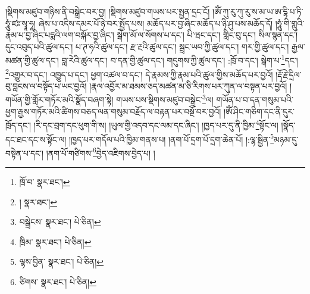 །སྡིགས་མཛུབ་གཉིས་ནི་བསྒྲེང་བར་བྱ། །སྡིགས་མཛུབ་གཡས་པར་སྤྱན་དྲང་ངོ། །ཨོཾ་ཀུ་རུ་ཀུ་རུ་ས་མ་ཡ་ཨ་དྷི་པ་ཏི་ཧཱུཾ་ཛཿ་སྭཱ་ཧཱ། ཞེས་པ་འདིས་དམར་པོ་ཉེ་བར་སྤྱོད་པས། མཆོད་པར་བྱ་ཞིང་མཆོད་པ་ཉི་ཤུ་པས་མཆོད་དོ། །ཧཱུཾ་གི་གླུའི་རྣམ་པ་བྱ་ཞིང་པདྨའི་ལག་བསྐོར་བྱ་ཞིང་། སྒེག་མོ་ལ་སོགས་པ་དང་། པི་ཝང་དང་། གླིང་བུ་དང་། སིལ་སྙན་དང་། དུང་འབུད་པའི་ཚུལ་དང་། པ་ཊ་ཧའི་ཚུལ་དང་། རྫ་རྔའི་ཚུལ་དང་། སྦྲང་ཡབ་ཀྱི་ཚུལ་དང་། གར་གྱི་ཚུལ་དང་། རྒྱལ་མཚན་གྱི་ཚུལ་དང་། བླ་རེའི་ཚུལ་དང་། བ་དན་གྱི་ཚུལ་དང་། གདུགས་ཀྱི་ཚུལ་དང་། :ཁྲོ་བ་དང་། སྒེག་པ་\footnote{ཁྲོ་བ་  སྣར་ཐང་། }དང་། \footnote{།    སྣར་ཐང་། }འགྱུར་བ་དང་། འཁྱུད་པ་དང་། ཕྱག་འཚལ་བ་དང་། དེ་རྣམས་ཀྱི་རྣམ་པའི་ཚུལ་གྱིས་མཆོད་པར་བྱའོ། །རྡོ་རྗེ་དྲིལ་བུ་བླངས་ལ་བསྟོད་པ་ཡང་བྱའོ། །རྣལ་འབྱོར་མ་ཐམས་ཅད་མཚན་མ་ཅི་རིགས་པར་ཀུན་ལ་བསྟན་པར་བྱའོ། །གཡོན་གྱི་གློར་གཏོར་མའི་སྣོད་བཞག་སྟེ། གཡས་པས་སྡིགས་མཛུབ་བསྒྲེང་\footnote{བསྒྲེངས་  སྣར་ཐང་།  པེ་ཅིན། }ལ། གཡོན་པ་བ་དན་གསུམ་པའི་ཕྱག་རྒྱས་གཏོར་མའི་ཚིགས་བཅད་ལན་གསུམ་བརྗོད་ལ་བརྟན་པར་བསྔོ་བར་བྱའོ། །ཨོཾ་ཤིང་གཅིག་དང་ནི་དུར་ཁྲོད་དང་། །རི་དང་བྲག་དང་ཕུག་གི་ས། །ཡུལ་གྱི་འདབ་དང་ལམ་དང་ཞིང་། །ཁྱད་པར་དུ་ནི་ཁྱིམ་\footnote{ཁྲིམ་  སྣར་ཐང་།  པེ་ཅིན། }སྟོང་ལ། །སྣོད་དང་ཐང་དང་ས་སྟོང་ལ། །ཁྱད་པར་གདོལ་པའི་ཁྱིམ་གནས་པ། །ནག་པོ་དྲག་པོ་དྲག་ཆེན་པོ། །:ལྷ་སྦྱིན་\footnote{ལྷས་བྱིན་  སྣར་ཐང་།  པེ་ཅིན། }མཉམ་དུ་བསྟེན་པ་དང་། །ནག་པོ་གཙིགས་\footnote{ཙིགས་  སྣར་ཐང་།  པེ་ཅིན། }བྱེད་འཇིགས་བྱེད་པ། །
